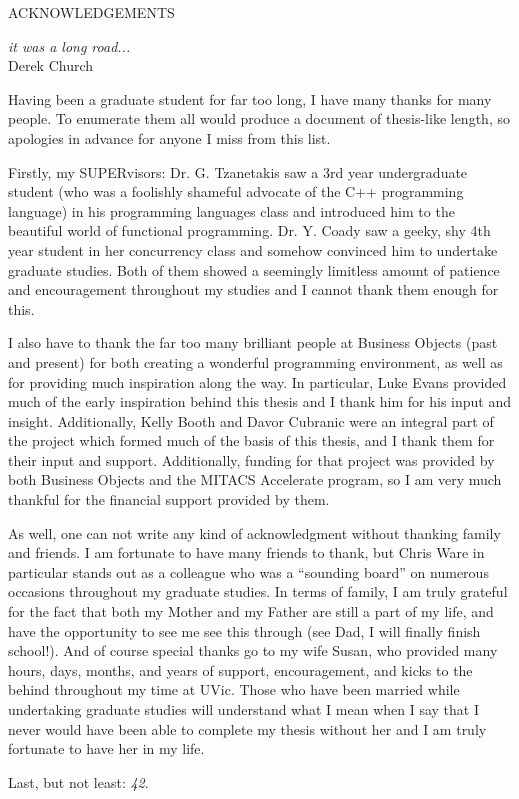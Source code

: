 \newpage
{}

\begin{center}
ACKNOWLEDGEMENTS
\end{center}

\begin{flushright}
\textit{it was a long road...}
\\
Derek Church \cite{Church06}\\
\end{flushright}

Having been a graduate student for far too long, I have many thanks for many people.  To enumerate them all would produce a document of thesis-like length, so apologies in advance for anyone I miss from this list.

Firstly, my SUPERvisors: Dr. G. Tzanetakis saw a 3rd year undergraduate student (who was a foolishly shameful advocate of the C++ programming language) in his programming languages class and introduced him to the beautiful world of functional programming.  Dr. Y. Coady saw a geeky, shy 4th year student in her concurrency class and somehow convinced him to undertake graduate studies.  Both of them showed a seemingly limitless amount of patience and encouragement throughout my studies and I cannot thank them enough for this.

I also have to thank the far too many brilliant people at Business Objects (past and present) for both creating a wonderful programming environment, as well as for providing much inspiration along the way.  In particular, Luke Evans provided much of the early inspiration behind this thesis and I thank him for his input and insight.  Additionally, Kelly Booth and Davor Cubranic were an integral part of the project which formed much of the basis of this thesis, and I thank them for their input and support.  Additionally, funding for that project was provided by both Business Objects and the MITACS Accelerate program, so I am very much thankful for the financial support provided by them.

As well, one can not write any kind of acknowledgment without thanking family and friends.  I am fortunate to have many friends to thank, but Chris Ware in particular stands out as a colleague who was a ``sounding board'' on numerous occasions throughout my graduate studies.  In terms of family, I am truly grateful for the fact that both my Mother and my Father are still a part of my life, and have the opportunity to see me see this through (see Dad, I will finally finish school!).  And of course special thanks go to my wife Susan, who provided many hours, days, months, and years of support, encouragement, and kicks to the behind throughout my time at UVic.  Those who have been married while undertaking graduate studies will understand what I mean when I say that I never would have been able to complete my thesis without her and I am truly fortunate to have her in my life.

Last, but not least: \emph{42}.

